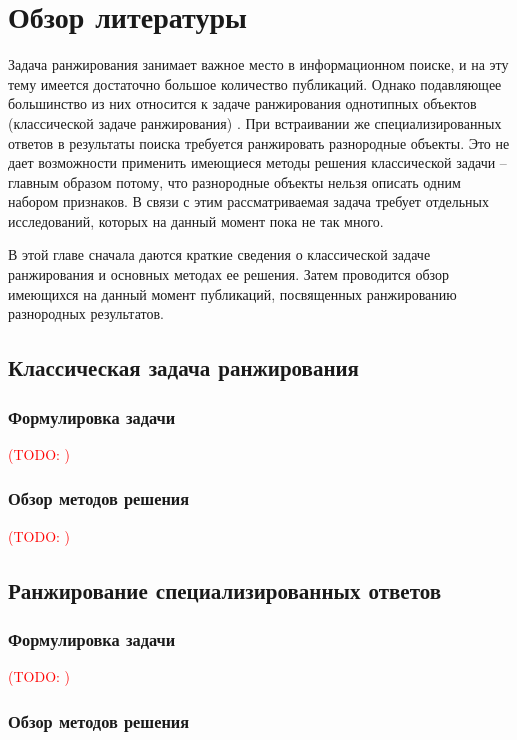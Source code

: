 \documentclass[12pt,a4paper]{report}
\newcommand\note[1]{\textcolor{red}{(#1)}}
\newcommand\todonote[1]{\note{TODO: #1}}
\begin{document}
\chapter{Обзор литературы}

Задача ранжирования занимает важное место в информационном поиске, и на эту тему имеется достаточно большое количество публикаций. Однако подавляющее большинство из них относится к задаче ранжирования однотипных объектов (классической задаче ранжирования) \cite{Liu-LR}. При встраивании же специализированных ответов в результаты поиска требуется ранжировать разнородные объекты. Это не дает возможности применить имеющиеся методы решения классической задачи -- главным образом потому, что разнородные объекты нельзя описать одним набором признаков. В связи с этим рассматриваемая задача требует отдельных исследований, которых на данный момент пока не так много.

В этой главе сначала даются краткие сведения о классической задаче ранжирования и основных методах ее решения. Затем проводится обзор имеющихся на данный момент публикаций, посвященных ранжированию разнородных результатов.

\section{Классическая задача ранжирования}
\subsection{Формулировка задачи}

\todonote{}

\subsection{Обзор методов решения}

\todonote{}

\section{Ранжирование специализированных ответов}

\subsection{Формулировка задачи}

\todonote{}

\subsection{Обзор методов решения}
\end{document}
